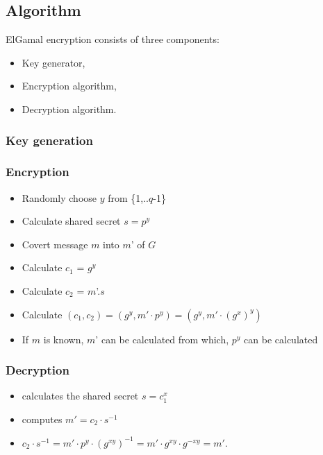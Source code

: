 \documentclass[12pt]{article}
\begin{document}
\subsection{Algorithm}
ElGamal encryption consists of three components: 
\begin{itemize}

\item Key generator,
\item Encryption algorithm,
\item Decryption algorithm.
\end{itemize}

\subsubsection{Key generation}

\subsubsection{Encryption}
\begin{itemize}
\item Randomly choose \(y\) from \{1,..\(q\)-1\}
\item Calculate shared secret $s = p^y$
\item Covert message \(m\) into \(m\)' of \(G\)
\item Calculate \(c_{1}\) = $g^y$
\item Calculate \(c_{2}\) = \(m\)'.\(s\) 
\item Calculate $(c_{1},c_{2})=(g^y, m'\cdot p^y)=(g^y, m'\cdot(g^x)^y)$ \\
\item If \(m\) is known, \(m\)' can be calculated from which, $p^y$ can be calculated
\end{itemize}

\subsubsection{Decryption}
\begin{itemize}
\item calculates the shared secret $s=c_1^x\,$
\item computes $m'=c_2 \cdot s^{-1}\,$
\item $c_2 \cdot s^{-1} = m'\cdot p^y \cdot (g^{xy})^{-1} = m'\cdot g^{xy} \cdot g^{-xy} = m'.$
\end{itemize}
\end{document}

